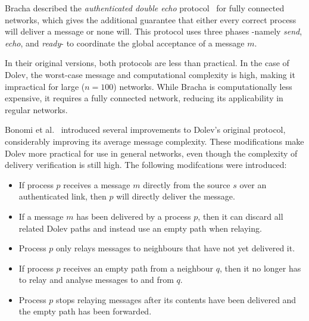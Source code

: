 Bracha described the \textit{authenticated double echo} protocol~\cite{bracha} for fully connected networks, which gives the additional guarantee that either every correct process will deliver a message or none will. This protocol uses three phases -namely \textit{send}, \textit{echo}, and \textit{ready}- to coordinate the global acceptance of a message $m$.

In their original versions, both protocols are less than practical. In the case of Dolev, the worst-case message and computational complexity is high, making it impractical for large ($n=100$) networks. While Bracha is computationally less expensive, it requires a fully connected network, reducing its applicability in regular networks.

Bonomi et al.~\cite{bonomi2019multihop} introduced several improvements to Dolev's original protocol, considerably improving its average message complexity. These modifications make Dolev more practical for use in general networks, even though the complexity of delivery verification is still high. The following modifcations were introduced:
\begin{itemize}
    \item If process $p$ receives a message $m$ directly from the source $s$ over an authenticated link, then $p$ will directly deliver the message.
    \item If a message $m$ has been delivered by a process $p$, then it can discard all related Dolev paths and instead use an empty path when relaying.
    \item Process $p$ only relays messages to neighbours that have not yet delivered it.
    \item If process $p$ receives an empty path from a neighbour $q$, then it no longer has to relay and analyse messages to and from $q$.
    \item Process $p$ stops relaying messages after its contents have been delivered and the empty path has been forwarded.
\end{itemize}

